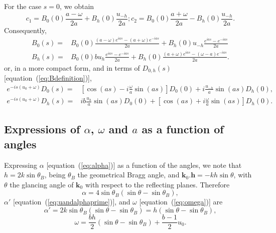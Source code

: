 \documentclass[preprint]{iucr}              %
\newcommand{\inred}[1]{{\color{red}#1}}
\begin{document}
For the case $s=0$, we obtain
\begin{equation}
\label{eq:cs}
c_1=B_0(0) \frac{a-\omega}{2a}
+ B_h(0) \frac{u_{-h}}{2a}; 
c_2=B_0(0)
\frac{a+\omega}{2a} - 
B_h(0) \frac{u_{-h}}{2a}. \nonumber
\end{equation}
Consequently, 
\begin{subequations}
\label{eq:preBSolutions}
\begin{align}
B_0(s) = &B_0(0) \frac{(a-\omega)e^{ias}-(a+\omega) e^{-ias}}{2a} +
B_h(0) u_{-h} \frac{e^{ias} - e^{-ias}}{2a} \nonumber\\
B_h(s) = &B_0(0) b u_h 
\frac{e^{ias}-e^{-ias}}{2a}
+ B_h(0) 
\frac{(a+\omega) e^{ias}- (\omega-a) e^{-ias}}{2a}
. \nonumber
\end{align}
\end{subequations}
or, in a more compact form, and in terms of $D_{0,h}(s)$ [equation~(\ref{eq:Bdefinition})],
\begin{subequations}
\label{eq:DSolutionsCompact}
\begin{align}
e^{-is(u_0+\omega)} D_0(s) = & [\cos(as) - i\frac{\omega}{a}\sin(as)] D_0(0) +     i \frac{u_{-h}}{a}\sin(as) D_h(0), \\
e^{-is(u_0+\omega)} D_h(s) = & i b \frac{u_h}{a} \sin(as) D_0(0) + 
    [\cos(as) + i \frac{\omega}{a} \sin(as)] D_h(0).
\end{align}
\end{subequations}

\subsection{Expressions of  $\alpha$, $\omega$ and $a$ as a function of angles}
\label{sec:physical_meaning}
Expressing $\alpha$ [equation~(\ref{eq:alpha})] as a function of the angles, we note that $h=2k \sin\theta_B$, being $\theta_B$ the geometrical Bragg angle, and $\textbf{k}_0 . \textbf{h}= -k h \sin\theta$, with $\theta$ the glancing angle of $\textbf{k}_0$ with respect to the reflecting planes. Therefore
\begin{equation}\label{eq:alphavsangles}
    \alpha=4\sin\theta_B (\sin\theta-\sin\theta_B),
\end{equation}
$\alpha'$ [equation~(\ref{eq:uandalphaprime})], and $\omega$ [equation~(\ref{eq:omega})] are
\begin{equation}\label{eq:alphaprimevsangles}
    \alpha'=2 k \sin\theta_B(\sin\theta-\sin\theta_B)=h(\sin\theta-\sin\theta_B),
\end{equation}
\begin{equation}\label{eq:omegavsangles}
    \omega=\frac{b h}{2} (\sin\theta-\sin\theta_B) + \frac{b-1}{2} u_0.
\end{equation}
\end{document}

